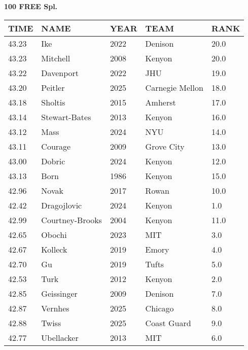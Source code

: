 \begin{table}[H]
\centering
\begin{minipage}[t]{0.6\textwidth}
\centering
\textbf{100 FREE Spl.}\\[0.1cm]
\begin{tabular}{@{}p{1.8cm}p{2.8cm}p{1.2cm}p{1.4cm}p{0.8cm}@{}}
\hline
    \textbf{TIME} & \textbf{NAME} & \textbf{YEAR} & \textbf{TEAM} & \textbf{RANK} \\
\hline
    43.23 & Ike & 2022 & Denison & 20.0 \\
    43.23 & Mitchell & 2008 & Kenyon & 20.0 \\
    43.22 & Davenport & 2022 & JHU & 19.0 \\
    43.20 & Peitler & 2025 & Carnegie Mellon & 18.0 \\
    43.18 & Sholtis & 2015 & Amherst & 17.0 \\
    43.14 & Stewart-Bates & 2013 & Kenyon & 16.0 \\
    43.12 & Mass & 2024 & NYU & 14.0 \\
    43.11 & Courage & 2009 & Grove City & 13.0 \\
    43.00 & Dobric & 2024 & Kenyon & 12.0 \\
    43.13 & Born & 1986 & Kenyon & 15.0 \\
    42.96 & Novak & 2017 & Rowan & 10.0 \\
    42.42 & Dragojlovic & 2024 & Kenyon & 1.0 \\
    42.99 & Courtney-Brooks & 2004 & Kenyon & 11.0 \\
    42.65 & Obochi & 2023 & MIT & 3.0 \\
    42.67 & Kolleck & 2019 & Emory & 4.0 \\
    42.70 & Gu & 2019 & Tufts & 5.0 \\
    42.53 & Turk & 2012 & Kenyon & 2.0 \\
    42.85 & Geissinger & 2009 & Denison & 7.0 \\
    42.87 & Vernhes & 2025 & Chicago & 8.0 \\
    42.88 & Twiss & 2025 & Coast Guard & 9.0 \\
    42.77 & Ubellacker & 2013 & MIT & 6.0 \\
\hline
\end{tabular}
\end{minipage}
\end{table}

